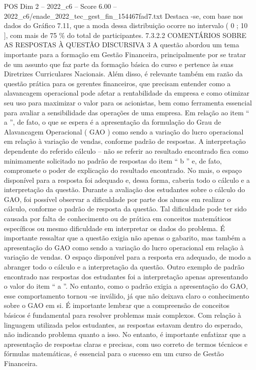 \begin{textsample}{POS Dim 2 – 2022\_c6 – Score 6.00 – 2022\_c6/enade\_2022\_tec\_gest\_fin\_154467fad7.txt}
Destaca -se, com base nos dados do Gráfico 7.11, que a moda dessa distribuição ocorre no intervalo ( 0 ; 10 ], com mais de 75 \% do total de participantes. 7.3.2.2 COMENTÁRIOS SOBRE AS RESPOSTAS À QUESTÃO DISCURSIVA 3 A questão abordou um tema importante para a formação em Gestão Financeira, principalmente por se tratar de um assunto que faz parte da formação básica do curso e pertence às suas Diretrizes Curriculares Nacionais.
Além disso, é relevante também em razão da questão prática para os gerentes financeiros, que precisam entender como a alavancagem operacional pode afetar a rentabilidade da empresa e como otimizar seu uso para maximizar o valor para os acionistas, bem como ferramenta essencial para avaliar a sensibilidade das operações de uma empresa.
Em relação ao item “ a ”, de fato, o que se espera é a apresentação da formulação do Grau de Alavancagem Operacional ( GAO ) como sendo a variação do lucro operacional em relação à variação de vendas, conforme padrão de respostas.
A interpretação dependente do referido cálculo – não se referir ao resultado encontrado fica como minimamente solicitado no padrão de respostas do item “ b ” e, de fato, compromete o poder de explicação do resultado encontrado.
No mais, o espaço disponível para a resposta foi adequado e, dessa forma, caberia todo o cálculo e a interpretação da questão.
Durante a avaliação dos estudantes sobre o cálculo do GAO, foi possível observar a dificuldade por parte dos alunos em realizar o cálculo, conforme o padrão de resposta da questão.
Tal dificuldade pode ter sido causada por falta de conhecimento ou de prática em conceitos matemáticos específicos ou mesmo dificuldade em interpretar os dados do problema.
É importante ressaltar que a questão exigia não apenas o gabarito, mas também a apresentação do GAO como sendo a variação do lucro operacional em relação à variação de vendas.
O espaço disponível para a resposta era adequado, de modo a abranger todo o cálculo e a interpretação da questão.
Outro exemplo de padrão encontrado nas respostas dos estudantes foi a interpretação apenas apresentando o valor do item “ a ”.
No entanto, como o padrão exigia a apresentação do GAO, esse comportamento tornou -se inválido, já que não deixava claro o conhecimento sobre o GAO em si.
É importante lembrar que a compreensão de conceitos básicos é fundamental para resolver problemas mais complexos.
Com relação à linguagem utilizada pelos estudantes, as respostas estavam dentro do esperado, não indicando problema quanto a isso.
No entanto, é importante enfatizar que a apresentação de respostas claras e precisas, com uso correto de termos técnicos e fórmulas matemáticas, é essencial para o sucesso em um curso de Gestão Financeira.

\end{textsample}
